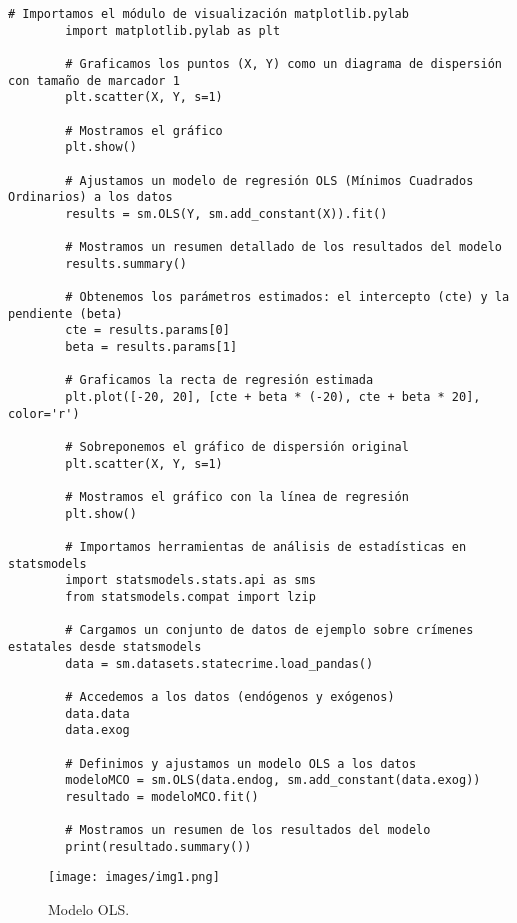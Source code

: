 \documentclass[a4paper,12pt]{article}
\begin{document}
    \begin{lstlisting}[style=custompython, caption=Ajuste y visualización de un modelo OLS con statsmodels]
        # Importamos el módulo de visualización matplotlib.pylab
        import matplotlib.pylab as plt
        
        # Graficamos los puntos (X, Y) como un diagrama de dispersión con tamaño de marcador 1
        plt.scatter(X, Y, s=1)
        
        # Mostramos el gráfico
        plt.show()
        
        # Ajustamos un modelo de regresión OLS (Mínimos Cuadrados Ordinarios) a los datos
        results = sm.OLS(Y, sm.add_constant(X)).fit()
        
        # Mostramos un resumen detallado de los resultados del modelo
        results.summary()
        
        # Obtenemos los parámetros estimados: el intercepto (cte) y la pendiente (beta)
        cte = results.params[0]
        beta = results.params[1]
        
        # Graficamos la recta de regresión estimada
        plt.plot([-20, 20], [cte + beta * (-20), cte + beta * 20], color='r')
        
        # Sobreponemos el gráfico de dispersión original
        plt.scatter(X, Y, s=1)
        
        # Mostramos el gráfico con la línea de regresión
        plt.show()
        
        # Importamos herramientas de análisis de estadísticas en statsmodels
        import statsmodels.stats.api as sms
        from statsmodels.compat import lzip
        
        # Cargamos un conjunto de datos de ejemplo sobre crímenes estatales desde statsmodels
        data = sm.datasets.statecrime.load_pandas()
        
        # Accedemos a los datos (endógenos y exógenos)
        data.data
        data.exog
        
        # Definimos y ajustamos un modelo OLS a los datos
        modeloMCO = sm.OLS(data.endog, sm.add_constant(data.exog))
        resultado = modeloMCO.fit()
        
        # Mostramos un resumen de los resultados del modelo
        print(resultado.summary())
        \end{lstlisting}
        
        \begin{figure}[H]
            \centering
            \texttt{[image: images/img1.png]}
            \caption{Modelo OLS.}
            \label{fig:ols_regression}
        \end{figure}
\end{document}
